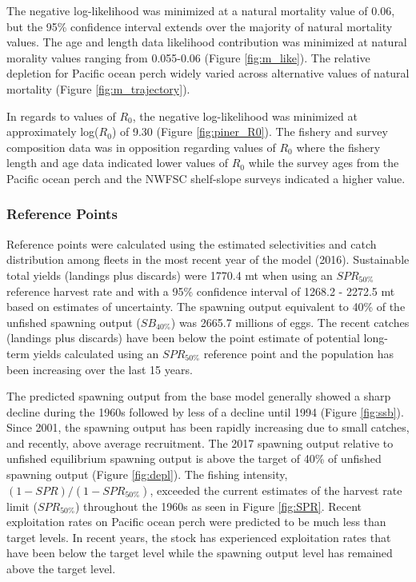 \documentclass[12pt,]{article}
\begin{document}
The negative log-likelihood was minimized at a natural mortality value
of 0.06, but the 95\% confidence interval extends over the majority of
natural mortality values. The age and length data likelihood
contribution was minimized at natural morality values ranging from
0.055-0.06 (Figure \ref{fig:m_like}). The relative depletion for Pacific
ocean perch widely varied across alternative values of natural mortality
(Figure \ref{fig:m_trajectory}).

In regards to values of \(R_0\), the negative log-likelihood was
minimized at approximately log(\(R_0\)) of 9.30 (Figure
\ref{fig:piner_R0}). The fishery and survey composition data was in
opposition regarding values of \(R_0\) where the fishery length and age
data indicated lower values of \(R_0\) while the survey ages from the
Pacific ocean perch and the NWFSC shelf-slope surveys indicated a higher
value.

\subsubsection{Reference Points}\label{reference-points-1}

Reference points were calculated using the estimated selectivities and
catch distribution among fleets in the most recent year of the model
(2016). Sustainable total yields (landings plus discards) were 1770.4 mt
when using an \(SPR_{50\%}\) reference harvest rate and with a 95\%
confidence interval of 1268.2 - 2272.5 mt based on estimates of
uncertainty. The spawning output equivalent to 40\% of the unfished
spawning output (\(SB_{40\%}\)) was 2665.7 millions of eggs. The recent
catches (landings plus discards) have been below the point estimate of
potential long-term yields calculated using an \(SPR_{50\%}\) reference
point and the population has been increasing over the last 15 years.

The predicted spawning output from the base model generally showed a
sharp decline during the 1960s followed by less of a decline until 1994
(Figure \ref{fig:ssb}). Since 2001, the spawning output has been rapidly
increasing due to small catches, and recently, above average
recruitment. The 2017 spawning output relative to unfished equilibrium
spawning output is above the target of 40\% of unfished spawning output
(Figure \ref{fig:depl}). The fishing intensity,
\((1-SPR)/(1-SPR_{50\%})\), exceeded the current estimates of the
harvest rate limit (\(SPR_{50\%}\)) throughout the 1960s as seen in
Figure \ref{fig:SPR}. Recent exploitation rates on Pacific ocean perch
were predicted to be much less than target levels. In recent years, the
stock has experienced exploitation rates that have been below the target
level while the spawning output level has remained above the target
level.
\end{document}
